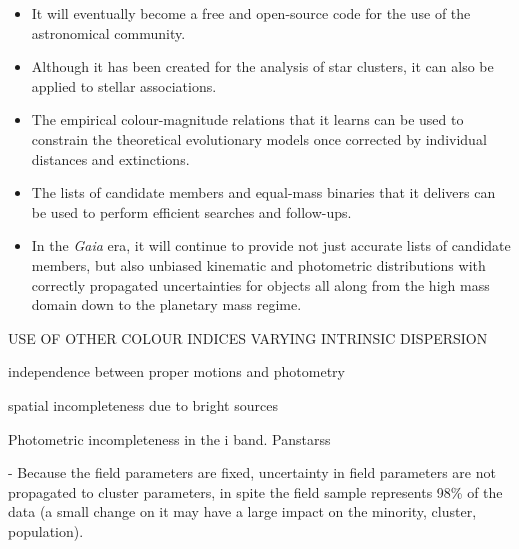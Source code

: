 \begin{itemize}
\item It will eventually become a free and open-source code for the use of the astronomical community.
\item Although it has been created for the analysis of star clusters, it can also be applied to stellar associations.
\item The empirical colour-magnitude relations that it learns can be used to constrain the theoretical evolutionary models once corrected by individual distances and extinctions.
\item The lists of candidate members and equal-mass binaries that it delivers can be used to perform efficient searches and follow-ups.
\item In the \emph{Gaia} era, it will continue to provide not just accurate lists of candidate members, but also unbiased kinematic and photometric distributions with correctly propagated uncertainties for objects all along from the high mass domain down to the planetary mass regime.
\end{itemize}

USE OF OTHER COLOUR INDICES
VARYING INTRINSIC DISPERSION

independence between proper motions and photometry

spatial incompleteness due to bright sources

Photometric incompleteness in the i band. Panstarss

- Because the field parameters are fixed, uncertainty in field parameters are not propagated to cluster parameters, in spite the field sample represents 98\% of the data (a small change on it may have a large impact on the minority, cluster, population).







